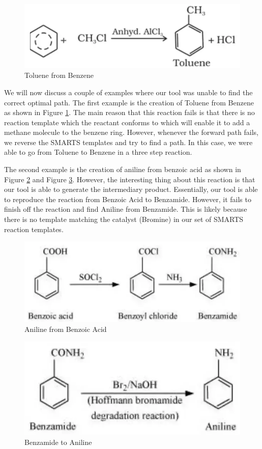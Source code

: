 \documentclass[preprint,12pt]{elsarticle}
\begin{document}
  \begin{figure}[h]
\centering\includegraphics[width=0.8\linewidth]{toulene_from_benzene}
\caption{Toluene from Benzene}
\label{fig:toulene_from_benzene}
\end{figure}

 We will now discuss a couple of examples where our tool was unable to find the correct optimal path. The first example is the creation of Toluene from Benzene as shown in Figure \ref{fig:toulene_from_benzene}. The main reason that this reaction fails is that there is no reaction template which the reactant conforms to which will enable it to add a methane molecule to the benzene ring. However, whenever the forward path fails, we reverse the SMARTS templates and try to find a path. In this case, we were able to go from Toluene to Benzene in a three step reaction. 

 The second example is the creation of aniline from benzoic acid as shown in Figure \ref{fig:aniline_from_benzoic} and Figure \ref{fig:aniline_from_benzoic_part2}. However, the interesting thing about this reaction is that our tool is able to generate the intermediary product. Essentially, our tool is able to reproduce the reaction from Benzoic Acid to Benzamide. However, it fails to finish off the reaction and find Aniline from Benzamide. This is likely because there is no template matching the catalyst (Bromine) in our set of SMARTS reaction templates.
  \begin{figure}[h]
\centering\includegraphics[width=0.8\linewidth]{temp}
\caption{Aniline from Benzoic Acid}
\label{fig:aniline_from_benzoic}
\end{figure}

\begin{figure}[h]
\centering\includegraphics[width=0.8\linewidth]{benzamide_to_aniline}
\caption{Benzamide to Aniline}
\label{fig:aniline_from_benzoic_part2}
\end{figure}
\end{document}
